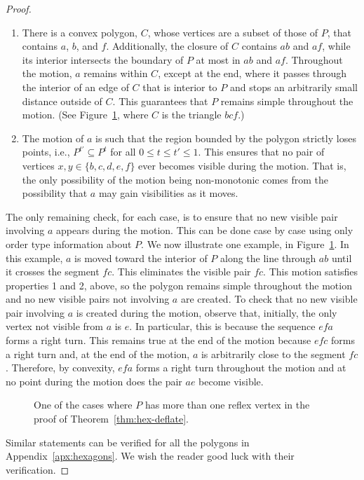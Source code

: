 \documentclass{amsart}
\begin{document}
\begin{proof}
  \begin{enumerate}
  \item There is a convex polygon, $C$, whose vertices are a subset of
    those of $P$, that contains $a$, $b$, and $f$.  Additionally, the
    closure of $C$ contains $ab$ and $af$, while its interior
    intersects the boundary of $P$ at most in $ab$ and $af$.
    Throughout the motion, $a$ remains within $C$, except at the end,
    where it passes through the interior of an edge of $C$ that is
    interior to $P$ and stops an arbitrarily small distance outside of
    $C$. This guarantees that $P$ remains simple throughout the
    motion.  (See Figure~\ref{fig:hexdef-example}, where $C$ is the
    triangle $bcf$.)
  
  \item
    The motion of $a$ is such that the region bounded by the polygon
    strictly loses points, i.e., $P^{t'} \subseteq P^t$ for all $0\le
    t\le t'\le 1$.  This ensures that no pair of vertices
    $x,y\in\{b,c,d,e,f\}$ ever becomes visible during the motion.
    That is, the only possibility of the motion being non-monotonic
    comes from the possibility that $a$ may gain visibilities as it
    moves.
  \end{enumerate}

  The only remaining check, for each case, is to ensure that no new
  visible pair involving $a$ appears during the motion. This can be
  done case by case using only order type information about $P$.  We
  now illustrate one example, in Figure~\ref{fig:hexdef-example}.  In
  this example, $a$ is moved toward the interior of $P$ along the line
  through $ab$ until it crosses the segment $fc$.  This eliminates the
  visible pair $fc$.  This motion satisfies properties 1 and 2, above,
  so the polygon remains simple throughout the motion and no new
  visible pairs not involving $a$ are created.  To check that no new
  visible pair involving $a$ is created during the motion, observe
  that, initially, the only vertex not visible from $a$ is $e$.  In
  particular, this is because the sequence $efa$ forms a right turn.
  This remains true at the end of the motion because $efc$ forms a
  right turn and, at the end of the motion, $a$ is arbitrarily close
  to the segment $fc$.  Therefore, by convexity, $efa$ forms a right
  turn throughout the motion and at no point during the motion does
  the pair $ae$ become visible.

  \begin{figure}[htb]
    \centering
    \quad
    \caption{One of the cases where $P$ has more than one reflex
      vertex in the proof of Theorem~\ref{thm:hex-deflate}.}
    \label{fig:hexdef-example}
  \end{figure}

  Similar statements can be verified for all the polygons in
  Appendix~\ref{apx:hexagons}.  We wish the reader good luck with
  their verification.
\end{proof}
\end{document}
